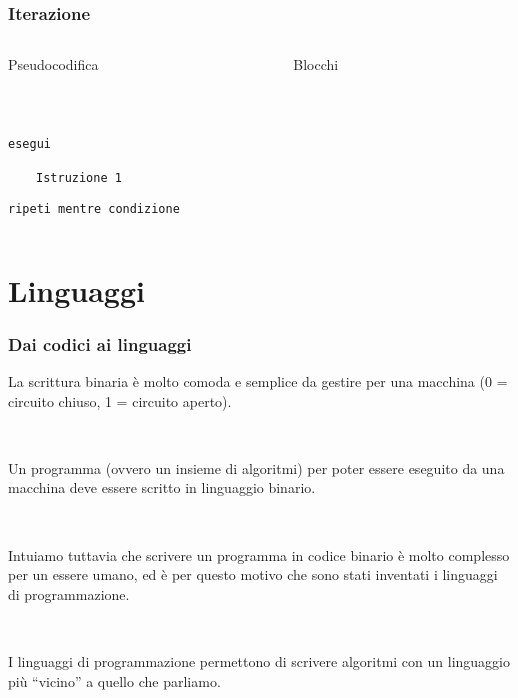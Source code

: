 \documentclass[]{beamer}
\begin{document}
\begin{frame}
\frametitle{Iterazione}
\begin{columns}
\begin{column}{0.5\textwidth}
\begin{center}
Pseudocodifica

~
\end{center}
\end{column}
\begin{column}{0.4\textwidth}
\begin{center}
Blocchi

~
\end{center}
\end{column}
\end{columns}
\begin{columns}
\begin{column}{0.5\textwidth}
\texttt{esegui}

~~~~\texttt{Istruzione 1}

\texttt{ripeti mentre condizione}
\end{column}
\begin{column}{0.4\textwidth}
\begin{figure}
\end{figure}
\end{column}
\end{columns}
\end{frame}



\section{Linguaggi}


\begin{frame}
\frametitle{Dai codici ai linguaggi}

La scrittura binaria è molto comoda e semplice da gestire per una macchina (0 = circuito chiuso, 1 = circuito aperto).\pause

~

Un programma (ovvero un insieme di algoritmi) per poter essere eseguito da una macchina \alert<2>{deve essere scritto in linguaggio binario}.\pause

~

Intuiamo tuttavia che scrivere un programma in codice binario è molto complesso per un essere umano, ed è per questo motivo che sono stati inventati i \alert<3>{linguaggi di programmazione}.\pause

~

I linguaggi di programmazione permettono di scrivere algoritmi con un linguaggio più ``vicino'' a quello che parliamo.
\end{frame}
\end{document}
